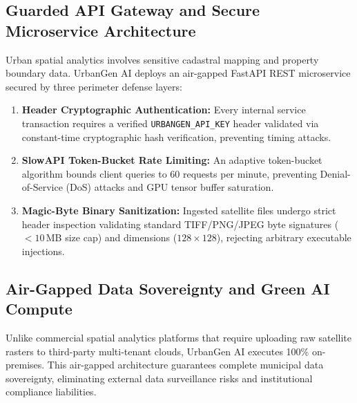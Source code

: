 \documentclass[journal]{IEEEtran}
\begin{document}
\subsection{Guarded API Gateway and Secure Microservice Architecture}
Urban spatial analytics involves sensitive cadastral mapping and property boundary data. UrbanGen AI deploys an air-gapped FastAPI REST microservice secured by three perimeter defense layers:
\begin{enumerate}
    \item \textbf{Header Cryptographic Authentication:} Every internal service transaction requires a verified \texttt{URBANGEN\_API\_KEY} header validated via constant-time cryptographic hash verification, preventing timing attacks.
    \item \textbf{SlowAPI Token-Bucket Rate Limiting:} An adaptive token-bucket algorithm bounds client queries to 60 requests per minute, preventing Denial-of-Service (DoS) attacks and GPU tensor buffer saturation.
    \item \textbf{Magic-Byte Binary Sanitization:} Ingested satellite files undergo strict header inspection validating standard TIFF/PNG/JPEG byte signatures ($<10$\,MB size cap) and dimensions ($128 \times 128$), rejecting arbitrary executable injections.
\end{enumerate}

\subsection{Air-Gapped Data Sovereignty and Green AI Compute}
Unlike commercial spatial analytics platforms that require uploading raw satellite rasters to third-party multi-tenant clouds, UrbanGen AI executes 100\% on-premises. This air-gapped architecture guarantees complete municipal data sovereignty, eliminating external data surveillance risks and institutional compliance liabilities.
\end{document}
